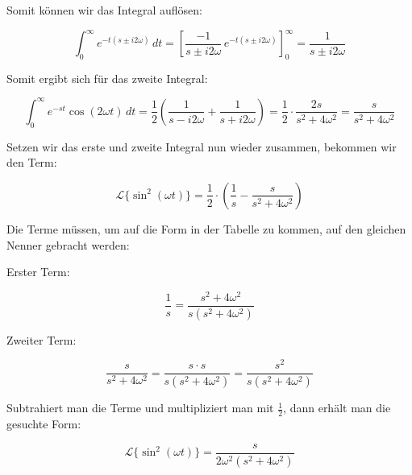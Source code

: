Somit können wir das Integral auflösen:

\[
\int_0^{\infty} e^{-t(s \pm i 2\omega)} \, dt 
= \left[ \frac{-1}{s \pm i 2\omega} \, e^{-t(s \pm i 2\omega)} \right]_0^{\infty} 
= \frac{1}{s \pm i 2\omega}
\]

Somit ergibt sich für das zweite Integral:

\[
\int_0^{\infty} e^{-st} \cos(2\omega t) \, dt 
= \frac{1}{2} \left( \frac{1}{s - i 2\omega} + \frac{1}{s + i 2\omega} \right)
= \frac{1}{2} \cdot \frac{2s}{s^2 + 4\omega^2}
= \frac{s}{s^2 + 4\omega^2}
\]

Setzen wir das erste und zweite Integral nun wieder zusammen, bekommen wir den Term:

\[
\mathcal{L} \{ \sin^2(\omega t) \}
= \frac{1}{2} \cdot \left( \frac{1}{s} - \frac{s}{s^2 + 4\omega^2} \right)
\]

Die Terme müssen, um auf die Form in der Tabelle zu kommen, auf den gleichen Nenner gebracht werden:

Erster Term:

\[
\frac{1}{s} = \frac{s^2 + 4\omega^2}{s(s^2 + 4\omega^2)}
\]

Zweiter Term:

\[
\frac{s}{s^2 + 4\omega^2} 
= \frac{s \cdot s}{s(s^2 + 4\omega^2)} 
= \frac{s^2}{s(s^2 + 4\omega^2)}
\]

Subtrahiert man die Terme und multipliziert man mit \(\frac{1}{2}\), dann erhält man die gesuchte Form:

\[
\mathcal{L} \{ \sin^2(\omega t) \} = \frac{s}{2\omega^2 (s^2 + 4\omega^2)}
\]


